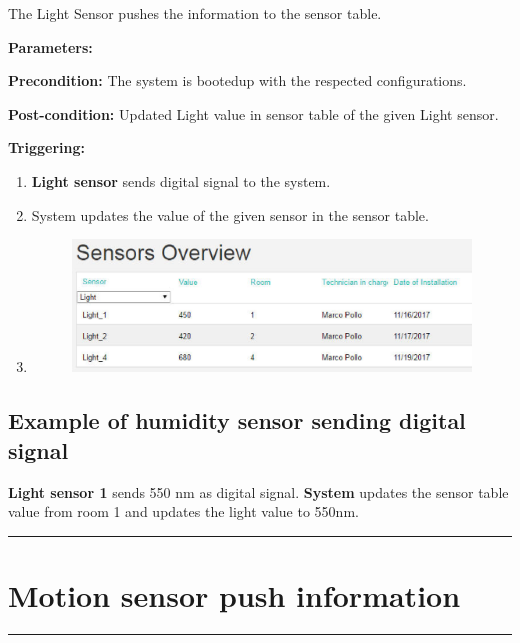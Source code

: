 The  Light Sensor pushes the information to the sensor table.
\begin{description}
\item \textbf{Parameters:} 
\item \textbf{Precondition:} The system is bootedup with the respected
configurations.
\item \textbf{Post-condition:} Updated Light value in sensor table of the given
Light sensor.

\item \textbf{Triggering:}
\begin{enumerate}
\item \textbf{Light sensor} sends digital signal to the system.
\item System updates the value of the given sensor in the sensor table.
\item \begin{figure}[H]
\includegraphics[width=1\textwidth]{images/LightSensor.eps}
\end{figure}
\end{enumerate}
\end{description}

\subsection{Example of humidity sensor sending digital signal}
\textbf{Light sensor 1} sends 550 nm as digital signal. \textbf{System}
updates the sensor table value from room 1 and updates the light value to 550nm.
\hfill
\vspace{0.5cm}
\hrule


\section{Motion sensor push information}

\hrule
\hfill
\vspace{0.5cm}
\label{operation:Motion sensor push information}

